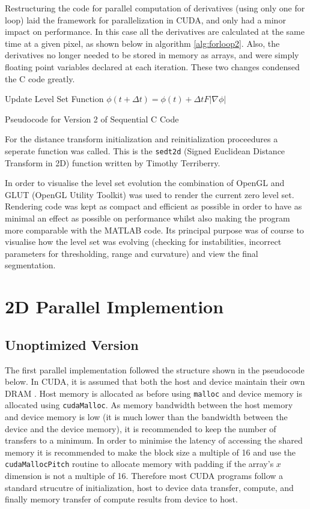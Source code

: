 Restructuring the code for parallel computation of derivatives (using only one for loop) laid the framework for parallelization in CUDA, and only had a minor impact on performance. In this case all the derivatives are calculated at the same time at a given pixel, as shown below in algorithm \ref{alg:forloop2}. Also, the derivatives no longer needed to be stored in memory as arrays, and were simply floating point variables declared at each iteration. These two changes condensed the C code greatly.


\begin{algorithm}[h]
\dontprintsemicolon
{}
\BlankLine
Update Level Set Function $\phi(t+\Delta t) =\phi(t) + \Delta t F|\nabla\phi|$\;
\caption{Pseudocode for Version 2 of Sequential C Code}\label{alg:forloop2}
\end{algorithm}

For the distance transform initialization and reinitialization proceedures a seperate function was called. This is the \texttt{sedt2d} (Signed Euclidean Distance Transform in 2D) function written by Timothy Terriberry.

In order to visualise the level set evolution the combination of OpenGL and GLUT (OpenGL Utility Toolkit) was used to render the current zero level set. Rendering code was kept as compact and efficient as possible in order to have as minimal an effect as possible on performance whilst also making the program more comparable with the MATLAB code. Its principal purpose was of course to visualise how the level set was evolving (checking for instabilities, incorrect parameters for thresholding, range and curvature) and view the final segmentation. 

\section{2D Parallel Implemention}
	\subsection{Unoptimized Version}
The first parallel implementation followed the structure shown in the pseudocode below. In CUDA, it is assumed that both the host and device maintain their own DRAM \cite{cuda}. Host memory is allocated as before using \texttt{malloc} and device memory is allocated using \texttt{cudaMalloc}. As memory bandwidth between the host memory and device memory is low (it is much lower than the bandwidth between the device and the device memory), it is recommended to keep the number of transfers to a minimum. In order to minimise the latency of accessing the shared memory it is recommended to make the block size a multiple of 16 and use the \texttt{cudaMallocPitch} routine to allocate memory with padding if the array's $x$ dimension is not a multiple of 16. Therefore most CUDA programs follow a standard strucutre of initialization, host to device data transfer, compute, and finally memory transfer of compute results from device to host. 

